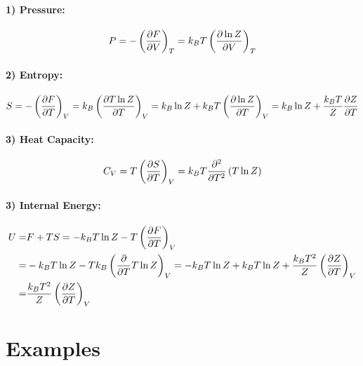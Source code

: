     \paragraph{1) Pressure:}
    \begin{equation}
        P = -\left( \frac{\partial F}{\partial V} \right)_T = k_BT\left( \frac{\partial \ln Z}{\partial V} \right)_T
    \end{equation}
    \paragraph{2) Entropy:}
    \begin{equation}
        S = -\left( \frac{\partial F}{\partial T} \right)_V = k_B\left( \frac{\partial T\ln Z}{\partial T} \right)_V=k_B\ln Z +k_BT\left( \frac{\partial \ln Z}{\partial T} \right)_V=k_B\ln Z+\frac{k_BT}{Z}\frac{\partial Z}{\partial T}
    \end{equation}
    \paragraph{3) Heat Capacity:}
    \begin{equation}
        C_V=T\left( \frac{\partial S}{\partial T} \right)_V = k_BT\frac{\partial ^2}{\partial T^2}\left( T\ln Z \right)
    \end{equation}
    \paragraph{3) Internal Energy:}
    \begin{align}
        U=&F+TS=-k_BT\ln Z - T\left( \frac{\partial F}{\partial T} \right)_V\notag\\
        =& -k_BT\ln Z -Tk_B\left( \frac{\partial }{\partial T}T\ln Z \right)_V = -k_BT\ln Z +k_BT\ln Z + \frac{k_BT^2}{Z}\left( \frac{\partial Z}{\partial T} \right)_V \notag\\
        =& \frac{k_BT^2}{Z}\left( \frac{\partial Z}{\partial T} \right)_V
    \end{align}
\section{Examples}
